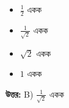 \documentclass[12pt, a4paper]{article}
\begin{document}
\begin{itemize}[label={}, leftmargin=1cm, itemsep=0.5em]
    \item[\textbf{A)}] $\frac{1}{2}$ একক
    \item[\textbf{B)}] $\frac{1}{\sqrt{2}}$ একক
    \item[\textbf{C)}] $\sqrt{2}$ একক
    \item[\textbf{D)}] $1$ একক
\end{itemize}

\vspace{0.5em}
\begin{tcolorbox}[answerbox]
    \textbf{\color{success} উত্তর:} B) $\frac{1}{\sqrt{2}}$ একক
\end{tcolorbox}
\vspace{1em}
\end{document}
